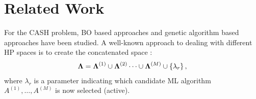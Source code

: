 \section{Related Work}
\label{sec:related_works}


For the CASH problem, BO based approaches \cite{thornton2013auto,snoek2012practical} and genetic algorithm based approaches \cite{whitley1994genetic,OlsonGECCO2016} have been studied.
%
A well-known approach to dealing with different HP spaces is to create the concatenated space 
\cite{thornton2013auto,levesque2017bayesian,feurer2015initializing,NIPS2015_11d0e628}: 
\begin{align*}
 \boldsymbol{\Lambda} = \boldsymbol{\Lambda}^{(1)} \cup \boldsymbol{\Lambda}^{(2)} \cdots \cup \boldsymbol{\Lambda}^{(M)} \cup \left\{\lambda_r\right\}, 
\end{align*}
where 
$\lambda_r$
is a parameter indicating which candidate ML algorithm $A^{(1)}, \ldots, A^{(M)}$ is now selected (active).
%
